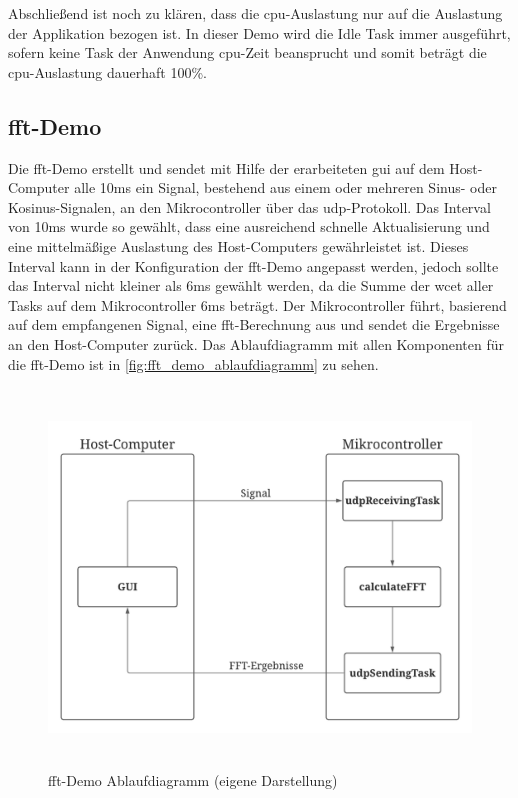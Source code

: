 \documentclass[../EDF Master Thesis.tex]{subfiles}
\begin{document}
    Abschließend ist noch zu klären, dass die \ac{cpu}-Auslastung nur auf die Auslastung der Applikation bezogen ist.
    In dieser Demo wird die Idle Task immer ausgeführt, sofern keine Task der Anwendung \ac{cpu}-Zeit beansprucht und somit beträgt die \ac{cpu}-Auslastung dauerhaft 100\%.

    \clearpage

    \subsection{\acf{fft}-Demo} \label{section:fft_demo}

        Die \ac{fft}-Demo erstellt und sendet mit Hilfe der erarbeiteten \ac{gui} auf dem Host-Computer alle 10ms ein Signal, bestehend aus einem oder mehreren Sinus- oder Kosinus-Signalen, an den Mikrocontroller über das \ac{udp}-Protokoll.
        Das Interval von 10ms wurde so gewählt, dass eine ausreichend schnelle Aktualisierung und eine mittelmäßige Auslastung des Host-Computers gewährleistet ist.
        Dieses Interval kann in der Konfiguration der \ac{fft}-Demo angepasst werden, jedoch sollte das Interval nicht kleiner als 6ms gewählt werden, da die Summe der \ac{wcet} aller Tasks auf dem Mikrocontroller 6ms beträgt.
        Der Mikrocontroller führt, basierend auf dem empfangenen Signal, eine \ac{fft}-Berechnung aus und sendet die Ergebnisse an den Host-Computer zurück.
        Das Ablaufdiagramm mit allen Komponenten für die \ac{fft}-Demo ist in \autoref{fig:fft_demo_ablaufdiagramm} zu sehen.

        \begin{figure}[H]
            \centering
            \includegraphics[height=10cm, width=14cm]{./attachments/FFT Ablauf.pdf}
            \caption[\ac{fft}-Demo Ablaufdiagramm]{\ac{fft}-Demo Ablaufdiagramm (eigene Darstellung)}
            \label{fig:fft_demo_ablaufdiagramm}
        \end{figure}
\end{document}
